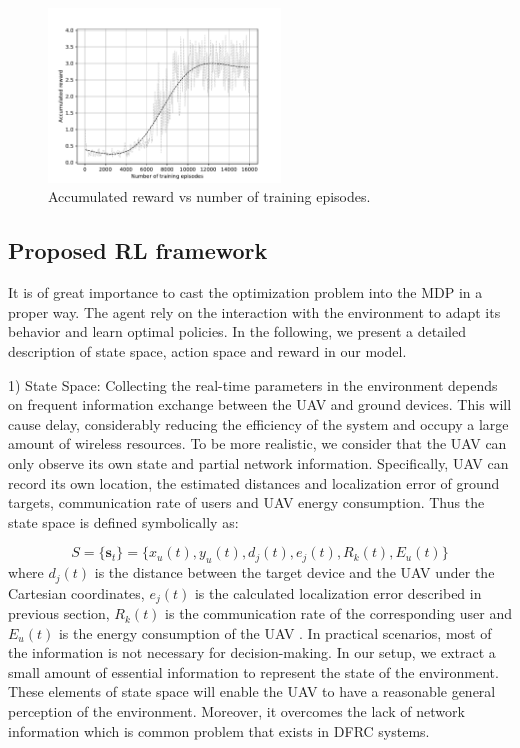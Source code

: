 \documentclass[journal,twocolumn]{IEEEtran}
\begin{document}
{\begin{figure}
\vspace{-10pt}
\hspace*{-0.2in}
  \centering
  \includegraphics[width=0.55\textwidth]{Figures/my_figure_6.pdf}
    \vspace*{-5mm}
  \caption{Accumulated reward vs number of training episodes.}\label{Results_1}
\end{figure}

\subsection{Proposed RL framework}

It is of great importance to cast the optimization problem into the MDP in a proper way. The agent rely on the interaction with the environment to adapt its behavior and learn optimal policies. In the following, we present a detailed description of state space, action space and reward in our model.

1) State Space: Collecting the real-time parameters in the environment depends on frequent information exchange between the UAV and ground devices. This will cause delay, considerably reducing the efficiency of the system and occupy a large amount of wireless resources. To be more realistic, we consider that the UAV can only observe its own state and partial network information. Specifically, UAV can record its own location, the estimated distances and localization error of ground targets, communication rate of users and UAV energy consumption. Thus the state space is defined symbolically as:

\begin{equation}
\textit{S} = \{\textbf{s}_t\} = \{ x_{u}(t),y_{u}(t) , d_{j}(t), e_{j}(t), R_{k}(t), E_{u}(t)   \}
\end{equation}
where $d_{j}(t)$ is the distance between the target device and the UAV under the Cartesian coordinates, $e_{j}(t)$ is the calculated localization error described in previous section, $R_{k}(t)$ is the communication rate of the corresponding user and $E_{u}(t)$ is the energy consumption of the UAV . In practical scenarios, most of the information is not necessary for decision-making. In our setup, we extract a small amount of essential information to represent the state of the environment. These elements of state space will enable the UAV to have a reasonable general perception of the environment. Moreover, it overcomes the lack of network information which is common problem that exists in DFRC systems.

}
\end{document}
